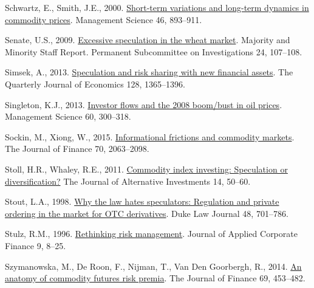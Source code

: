 \documentclass[]{elsarticle} %
\newlength{\cslhangindent}
\newlength{\cslentryspacingunit} %
\newenvironment{CSLReferences}[2] %
 {%
  \setlength{\parindent}{0pt}
  \ifodd #1
  \let\oldpar\par
  \def\par{\hangindent=\cslhangindent\oldpar}
  \fi
  \setlength{\parskip}{#2\cslentryspacingunit}
 }%
 {}
\begin{document}
\begin{CSLReferences}{1}{0}
\leavevmode{}%
Schwartz, E., Smith, J.E., 2000. \href{https://www.jstor.org/stable/2661607}{Short-term variations and long-term dynamics in commodity prices}. Management Science 46, 893--911.

\leavevmode{}%
Senate, U.S., 2009. \href{https://www.hsgac.senate.gov/imo/media/doc/REPORTExcessiveSpecullationintheWheatMarketwoexhibitschartsJune2409.pdf?attempt=2}{Excessive speculation in the wheat market}. Majority and Minority Staff Report. Permanent Subcommittee on Investigations 24, 107--108.

\leavevmode{}%
Simsek, A., 2013. \href{https://doi.org/10.1093/qje/qjt007}{Speculation and risk sharing with new financial assets}. The Quarterly Journal of Economics 128, 1365--1396.

\leavevmode{}%
Singleton, K.J., 2013. \href{https://doi.org/10.1287/mnsc.2013.1756}{Investor flows and the 2008 boom/bust in oil prices}. Management Science 60, 300--318.

\leavevmode{}%
Sockin, M., Xiong, W., 2015. \href{https://doi.org/10.1111/jofi.12261}{Informational frictions and commodity markets}. The Journal of Finance 70, 2063--2098.

\leavevmode{}%
Stoll, H.R., Whaley, R.E., 2011. \href{https://doi.org/10.2139/ssrn.1633908}{Commodity index investing: Speculation or diversification?} The Journal of Alternative Investments 14, 50--60.

\leavevmode{}%
Stout, L.A., 1998. \href{https://doi.org/10.2307/1373070}{Why the law hates speculators: Regulation and private ordering in the market for OTC derivatives}. Duke Law Journal 48, 701--786.

\leavevmode{}%
Stulz, R.M., 1996. \href{https://doi.org/10.1111/j.1745-6622.1996.tb00295.x}{Rethinking risk management}. Journal of Applied Corporate Finance 9, 8--25.

\leavevmode{}%
Szymanowska, M., De Roon, F., Nijman, T., Van Den Goorbergh, R., 2014. \href{https://doi.org/10.1111/jofi.12096}{An anatomy of commodity futures risk premia}. The Journal of Finance 69, 453--482.


\end{CSLReferences}
\end{document}

